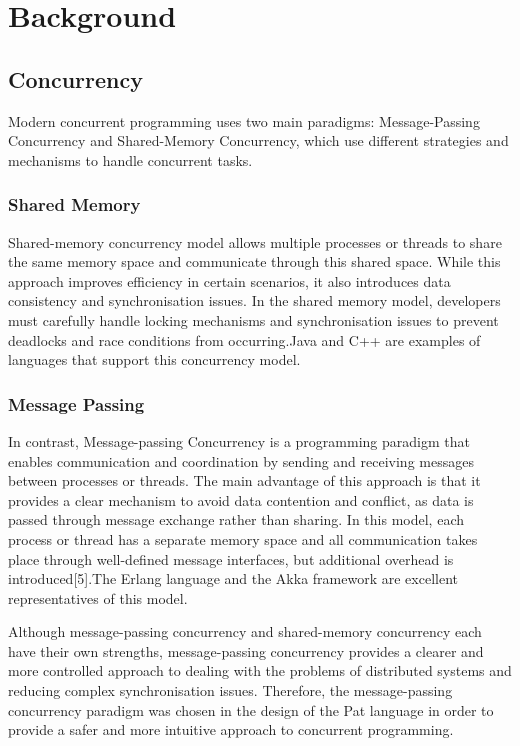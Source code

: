 \documentclass{l4proj}
\begin{document}
\chapter{Background}

\section{Concurrency}
Modern concurrent programming uses two main paradigms: Message-Passing Concurrency and Shared-Memory Concurrency, which use different strategies and mechanisms to handle concurrent tasks.

\subsection{Shared Memory}
Shared-memory concurrency model allows multiple processes or threads to share the same memory space and communicate through this shared space. While this approach improves efficiency in certain scenarios, it also introduces data consistency and synchronisation issues. In the shared memory model, developers must carefully handle locking mechanisms and synchronisation issues to prevent deadlocks and race conditions from occurring.Java and C++ are examples of languages that support this concurrency model.

\subsection{Message Passing}
In contrast, Message-passing Concurrency is a programming paradigm that enables communication and coordination by sending and receiving messages between processes or threads. The main advantage of this approach is that it provides a clear mechanism to avoid data contention and conflict, as data is passed through message exchange rather than sharing. In this model, each process or thread has a separate memory space and all communication takes place through well-defined message interfaces, but additional overhead is introduced[5].The Erlang language and the Akka framework are excellent representatives of this model.

Although message-passing concurrency and shared-memory concurrency each have their own strengths, message-passing concurrency provides a clearer and more controlled approach to dealing with the problems of distributed systems and reducing complex synchronisation issues. Therefore, the message-passing concurrency paradigm was chosen in the design of the Pat language in order to provide a safer and more intuitive approach to concurrent programming.
\end{document}
